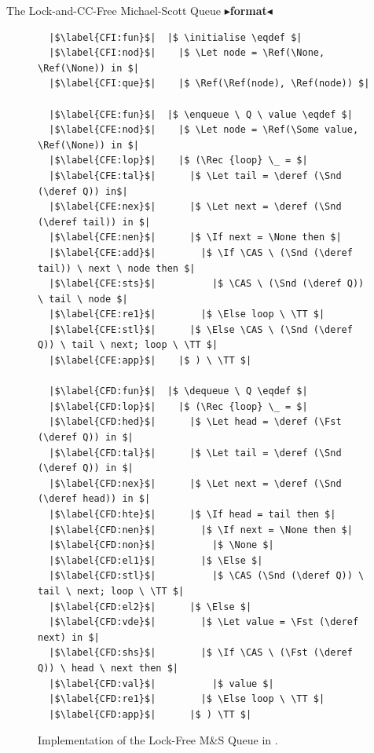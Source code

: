 \documentclass[9pt]{beamer}
\newcommand{\initialise}{\operatorname{initialize}}
\newcommand{\enqueue}{\operatorname{enqueue}}
\newcommand{\dequeue}{\operatorname{dequeue}}
\newcommand{\msq}{M\&S Queue}
\newcommand{\lfmsq}{Lock-Free \msq{}}
\newcommand{\todo}[1]{{\color[rgb]{.5,0,0}\textbf{$\blacktriangleright$#1$\blacktriangleleft$}}}
\begin{document}
\begin{frame}[fragile]{The Lock-and-CC-Free Michael-Scott Queue}
  \todo{format}
  \begin{figure}
  \begin{verbatim}
  |$\label{CFI:fun}$|  |$ \initialise \eqdef $|
  |$\label{CFI:nod}$|    |$ \Let node = \Ref(\None, \Ref(\None)) in $|
  |$\label{CFI:que}$|    |$ \Ref(\Ref(node), \Ref(node)) $|

  |$\label{CFE:fun}$|  |$ \enqueue \ Q \ value \eqdef $|
  |$\label{CFE:nod}$|    |$ \Let node = \Ref(\Some value, \Ref(\None)) in $|
  |$\label{CFE:lop}$|    |$ (\Rec {loop} \_ = $|
  |$\label{CFE:tal}$|      |$ \Let tail = \deref (\Snd (\deref Q)) in$|
  |$\label{CFE:nex}$|      |$ \Let next = \deref (\Snd (\deref tail)) in $|
  |$\label{CFE:nen}$|      |$ \If next = \None then $|
  |$\label{CFE:add}$|        |$ \If \CAS \ (\Snd (\deref tail)) \ next \ node then $|
  |$\label{CFE:sts}$|          |$ \CAS \ (\Snd (\deref Q)) \ tail \ node $|
  |$\label{CFE:re1}$|        |$ \Else loop \ \TT $|
  |$\label{CFE:stl}$|      |$ \Else \CAS \ (\Snd (\deref Q)) \ tail \ next; loop \ \TT $|
  |$\label{CFE:app}$|    |$ ) \ \TT $|

  |$\label{CFD:fun}$|  |$ \dequeue \ Q \eqdef $|
  |$\label{CFD:lop}$|    |$ (\Rec {loop} \_ = $|
  |$\label{CFD:hed}$|      |$ \Let head = \deref (\Fst (\deref Q)) in $|
  |$\label{CFD:tal}$|      |$ \Let tail = \deref (\Snd (\deref Q)) in $|
  |$\label{CFD:nex}$|      |$ \Let next = \deref (\Snd (\deref head)) in $|
  |$\label{CFD:hte}$|      |$ \If head = tail then $|
  |$\label{CFD:nen}$|        |$ \If next = \None then $|
  |$\label{CFD:non}$|          |$ \None $|
  |$\label{CFD:el1}$|        |$ \Else $|
  |$\label{CFD:stl}$|          |$ \CAS (\Snd (\deref Q)) \ tail \ next; loop \ \TT $|
  |$\label{CFD:el2}$|      |$ \Else $|
  |$\label{CFD:vde}$|        |$ \Let value = \Fst (\deref next) in $|
  |$\label{CFD:shs}$|        |$ \If \CAS \ (\Fst (\deref Q)) \ head \ next then $|
  |$\label{CFD:val}$|          |$ value $|
  |$\label{CFD:re1}$|        |$ \Else loop \ \TT $|
  |$\label{CFD:app}$|      |$ ) \TT $|
  \end{verbatim}
  \caption{Implementation of the \lfmsq{} in \heaplang.}
  \label{LFMSQ:implementation:code}
  \end{figure}
\end{frame}
\end{document}
